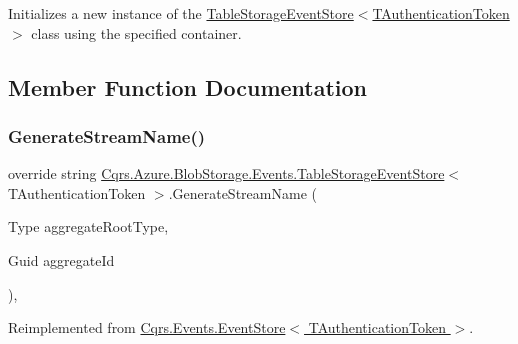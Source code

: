 Initializes a new instance of the \hyperlink{classCqrs_1_1Azure_1_1BlobStorage_1_1Events_1_1TableStorageEventStore_a25a65bc4a027b2a16ebf02e763ac3b95_a25a65bc4a027b2a16ebf02e763ac3b95}{Table\+Storage\+Event\+Store$<$\+T\+Authentication\+Token$>$} class using the specified container. 



\subsection{Member Function Documentation}
\mbox{\label{classCqrs_1_1Azure_1_1BlobStorage_1_1Events_1_1TableStorageEventStore_a5cee1f388c1a03d9cfea5ee1a9f42657_a5cee1f388c1a03d9cfea5ee1a9f42657}} 
\subsubsection{\texorpdfstring{Generate\+Stream\+Name()}{GenerateStreamName()}}
{\footnotesize\ttfamily override string \hyperlink{classCqrs_1_1Azure_1_1BlobStorage_1_1Events_1_1TableStorageEventStore}{Cqrs.\+Azure.\+Blob\+Storage.\+Events.\+Table\+Storage\+Event\+Store}$<$ T\+Authentication\+Token $>$.Generate\+Stream\+Name (\begin{DoxyParamCaption}\item[{Type}]{aggregate\+Root\+Type,  }\item[{Guid}]{aggregate\+Id }\end{DoxyParamCaption})\hspace{0.3cm}{\ttfamily [protected]}, {\ttfamily [virtual]}}



Reimplemented from \hyperlink{classCqrs_1_1Events_1_1EventStore_aba61739e47fdd0f7fce656f896cbe908_aba61739e47fdd0f7fce656f896cbe908}{Cqrs.\+Events.\+Event\+Store$<$ T\+Authentication\+Token $>$}.

\mbox{\label{classCqrs_1_1Azure_1_1BlobStorage_1_1Events_1_1TableStorageEventStore_a420c94c86d8d1c2959aee8602f43c0c0_a420c94c86d8d1c2959aee8602f43c0c0}} 
